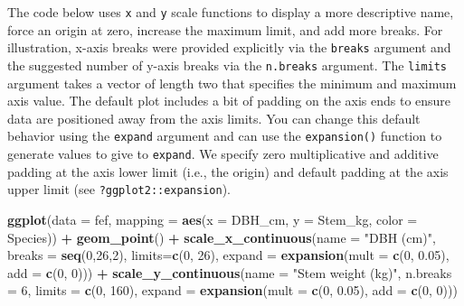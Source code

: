 \documentclass[
  11pt,
]{krantz}
\newenvironment{Shaded}{\begin{snugshade}}{\end{snugshade}}
\newcommand{\DataTypeTok}[1]{\textcolor[rgb]{0.13,0.29,0.53}{#1}}
\newcommand{\DecValTok}[1]{\textcolor[rgb]{0.00,0.00,0.81}{#1}}
\newcommand{\FloatTok}[1]{\textcolor[rgb]{0.00,0.00,0.81}{#1}}
\newcommand{\KeywordTok}[1]{\textcolor[rgb]{0.13,0.29,0.53}{\textbf{#1}}}
\newcommand{\NormalTok}[1]{#1}
\newcommand{\OperatorTok}[1]{\textcolor[rgb]{0.81,0.36,0.00}{\textbf{#1}}}
\newcommand{\StringTok}[1]{\textcolor[rgb]{0.31,0.60,0.02}{#1}}
\theoremstyle{definition}
\theoremstyle{definition}
\theoremstyle{definition}
\theoremstyle{definition}
\theoremstyle{remark}
\begin{document}
The code below uses \texttt{x} and \texttt{y} scale functions to display a more descriptive name, force an origin at zero, increase the maximum limit, and add more breaks. For illustration, x-axis breaks were provided explicitly via the \texttt{breaks} argument and the suggested number of y-axis breaks via the \texttt{n.breaks} argument. The \texttt{limits} argument takes a vector of length two that specifies the minimum and maximum axis value. The default plot includes a bit of padding on the axis ends to ensure data are positioned away from the axis limits. You can change this default behavior using the \texttt{expand} argument and can use the \texttt{expansion()} function to generate values to give to \texttt{expand}. We specify zero multiplicative and additive padding at the axis lower limit (i.e., the origin) and default padding at the axis upper limit (see \texttt{?ggplot2::expansion}).

\begin{Shaded}
\begin{Highlighting}[]
\KeywordTok{ggplot}\NormalTok{(}\DataTypeTok{data =}\NormalTok{ fef,}
       \DataTypeTok{mapping =} \KeywordTok{aes}\NormalTok{(}\DataTypeTok{x =}\NormalTok{ DBH\_cm, }\DataTypeTok{y =}\NormalTok{ Stem\_kg, }\DataTypeTok{color =}\NormalTok{ Species)) }\OperatorTok{+}
\StringTok{  }\KeywordTok{geom\_point}\NormalTok{() }\OperatorTok{+}
\StringTok{  }\KeywordTok{scale\_x\_continuous}\NormalTok{(}\DataTypeTok{name =} \StringTok{"DBH (cm)"}\NormalTok{, }
                     \DataTypeTok{breaks =} \KeywordTok{seq}\NormalTok{(}\DecValTok{0}\NormalTok{,}\DecValTok{26}\NormalTok{,}\DecValTok{2}\NormalTok{), }\DataTypeTok{limits=}\KeywordTok{c}\NormalTok{(}\DecValTok{0}\NormalTok{, }\DecValTok{26}\NormalTok{), }
                     \DataTypeTok{expand =} \KeywordTok{expansion}\NormalTok{(}\DataTypeTok{mult =} \KeywordTok{c}\NormalTok{(}\DecValTok{0}\NormalTok{, }\FloatTok{0.05}\NormalTok{), }
                                        \DataTypeTok{add =} \KeywordTok{c}\NormalTok{(}\DecValTok{0}\NormalTok{, }\DecValTok{0}\NormalTok{))) }\OperatorTok{+}
\StringTok{  }\KeywordTok{scale\_y\_continuous}\NormalTok{(}\DataTypeTok{name =} \StringTok{"Stem weight (kg)"}\NormalTok{,  }
                     \DataTypeTok{n.breaks =} \DecValTok{6}\NormalTok{, }\DataTypeTok{limits =} \KeywordTok{c}\NormalTok{(}\DecValTok{0}\NormalTok{, }\DecValTok{160}\NormalTok{), }
                     \DataTypeTok{expand =} \KeywordTok{expansion}\NormalTok{(}\DataTypeTok{mult =} \KeywordTok{c}\NormalTok{(}\DecValTok{0}\NormalTok{, }\FloatTok{0.05}\NormalTok{), }
                                        \DataTypeTok{add =} \KeywordTok{c}\NormalTok{(}\DecValTok{0}\NormalTok{, }\DecValTok{0}\NormalTok{)))}
\end{Highlighting}
\end{Shaded}
\end{document}
